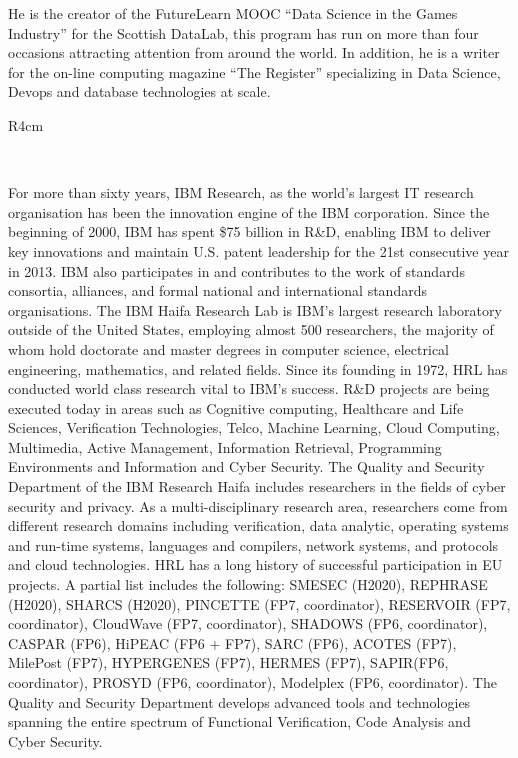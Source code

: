\documentclass[a4paper,11pt]{article}
\begin{document}
He is the creator of the FutureLearn MOOC “Data Science in the Games Industry” for the Scottish DataLab, this program has run on more than four occasions attracting attention from around the world. In addition, he is a writer for the on-line computing magazine “The Register” specializing in Data Science, Devops and database technologies at scale. 




\begin{wrapfigure}{R}{4cm}
\vspace{-2cm}
\hfill {}
\vspace{-1cm}
\end{wrapfigure}

\ 

For more than sixty years, IBM Research, as the world's largest IT research organisation has been the innovation engine of the IBM corporation. Since the beginning of 2000, IBM has spent \$75 billion in R\&D, enabling IBM to deliver key innovations and maintain U.S. patent leadership for the 21st consecutive
year in 2013.
IBM also participates in and contributes to the work of standards consortia, alliances, and formal national and international standards organisations. 
The IBM Haifa Research Lab is IBM's largest research laboratory outside of the United States, 
employing almost 500 researchers, the majority of whom hold doctorate and master degrees in computer science, electrical engineering, mathematics, and related fields. Since its founding in 1972, HRL has conducted world class research vital to IBM's success. R\&D projects are being executed today in areas such as Cognitive computing, Healthcare and Life Sciences, Verification Technologies, Telco, Machine Learning, Cloud Computing, Multimedia, Active Management, Information Retrieval, Programming Environments and Information and Cyber Security. The Quality and Security Department of the IBM Research Haifa includes researchers in the fields of cyber security and privacy. As a multi-disciplinary research area, researchers come from different research domains including verification, data analytic, operating systems and run-time systems, languages and compilers, network systems, and protocols and cloud technologies.
HRL has a long history of successful participation in EU projects. A partial list includes the following: SMESEC (H2020), REPHRASE (H2020), SHARCS (H2020), PINCETTE (FP7, coordinator), RESERVOIR (FP7, coordinator), CloudWave (FP7, coordinator), SHADOWS (FP6, coordinator), CASPAR (FP6), HiPEAC (FP6 + FP7), SARC (FP6), ACOTES (FP7), MilePost (FP7), HYPERGENES (FP7), HERMES (FP7), SAPIR(FP6, coordinator), PROSYD (FP6, coordinator), Modelplex (FP6, coordinator).
The Quality and Security Department develops advanced tools and technologies spanning the entire spectrum of Functional Verification, Code Analysis and Cyber Security.
\end{document}

